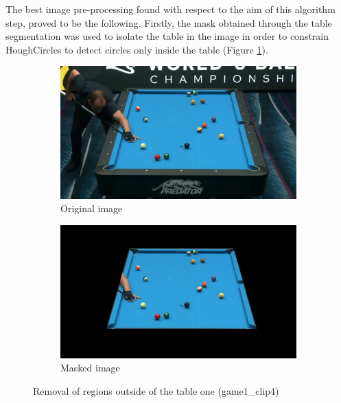The best image pre-processing found with respect to the aim of this algorithm step, proved to be the following.
Firstly, the mask obtained through the table segmentation was used to isolate the table in the image
in order to constrain HoughCircles to detect circles only inside the table (Figure \ref{fig:masking}). 
\begin{figure}[h!]
    \centering
    \begin{subfigure}[b]{0.45\textwidth}
        \centering
        \includegraphics[width=\textwidth]{imgs/ball_localization/original.jpg}
        \caption{Original image}
    \end{subfigure}
    \hspace{0.05\textwidth}
    \begin{subfigure}[b]{0.45\textwidth}
        \centering
        \includegraphics[width=\textwidth]{imgs/ball_localization/masked.jpg}
        \caption{Masked image}
    \end{subfigure}
    \caption{Removal of regions outside of the table one (game1\_clip4)}
    \label{fig:masking}
\end{figure}


